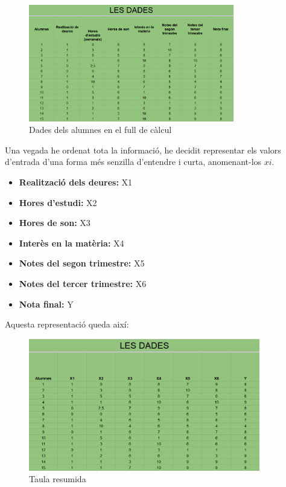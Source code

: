 \begin{figure}[h!]
    \centering
    \includegraphics[width=0.8\textwidth]{./figures/Dades.png}
    \caption{Dades dels alumnes en el full de càlcul}
\end{figure}

Una vegada he ordenat tota la informació, he decidit representar els valors d'entrada d'una forma més senzilla d'entendre i curta, anomenant-los $xi$.
\begin{itemize}
 \item \textbf {Realització dels deures:} X1
 \item \textbf {Hores d'estudi:} X2
 \item \textbf {Hores de son:} X3
 \item \textbf {Interès en la matèria:} X4
 \item \textbf {Notes del segon trimestre:} X5
 \item \textbf {Notes del tercer trimestre:} X6
 \item \textbf {Nota final:} Y
\end{itemize}

Aquesta representació queda així:

\begin{figure}[h!]
    \centering
    \includegraphics[width=0.9\textwidth]{./figures/Dades_resumides.png}
    \caption{Taula resumida}
\end{figure}

